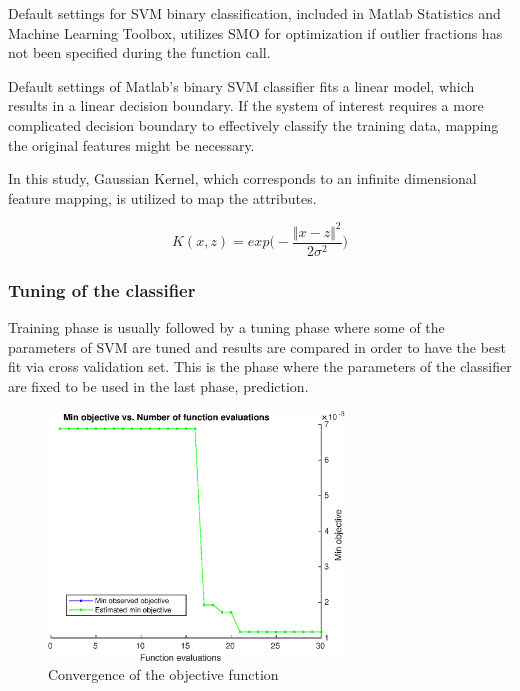 Default settings for SVM binary classification, included in Matlab Statistics and Machine Learning Toolbox, utilizes SMO for optimization if outlier fractions has not been specified during the function call. 

Default settings of Matlab's binary SVM classifier fits a linear model, which results in a linear decision boundary. 
If the system of interest requires a more complicated decision boundary to effectively classify the training data, mapping the original features might be necessary. 

In this study, Gaussian Kernel, which corresponds to an infinite dimensional feature mapping, is utilized to map the attributes.

\begin{equation}
K (x,z) = exp \bigg(-\frac{\Vert x - z \Vert ^ 2}{2 \sigma^2} \bigg)
\end{equation}


\subsubsection{Tuning of the classifier}

Training phase is usually followed by a tuning phase where some of the parameters of SVM are tuned and results are compared in order to have the best fit via cross validation set. This is the phase where the parameters of the classifier are fixed to be used in the last phase, prediction.

\begin{figure}
\begin{center}
\includegraphics[width=0.7\textwidth]{figures/objectiveFuncEval}    %
\caption{Convergence of the objective function} 
\label{fig:objectiveFuncEval}
\end{center}
\end{figure}


